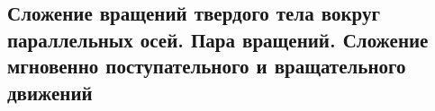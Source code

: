 

\subsection{Сложение вращений твердого тела вокруг параллельных осей. Пара вращений. Сложение мгновенно поступательного и вращательного движений}



